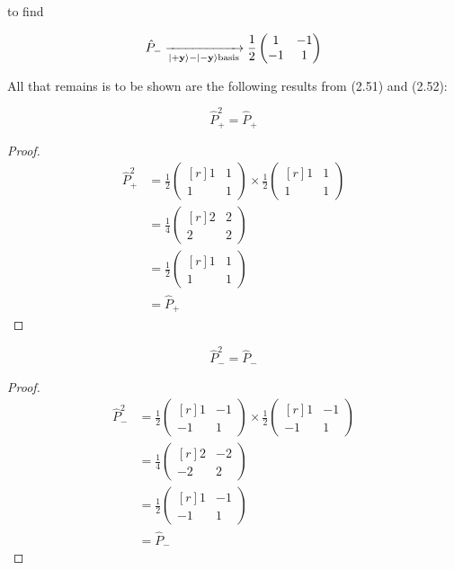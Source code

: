 \documentclass[11pt]{amsart}
\begin{document}
to find 

\[
\hat{P}_-\xrightarrow[\ket{+\textbf{y}}-\ket{-\textbf{y}}\text{basis}]{}
\frac{1}{2}
\begin{pmatrix*}
1&-1\\
-1&1
\end{pmatrix*}
\]

All that remains is to be shown are the following results from (2.51) and (2.52):

\[
\hat{P}_+^2=\hat{P}_+
\]

\begin{proof}

\begin{equation*}
\begin{split}
\hat{P}_+^2 & =
\frac{1}{2}
\begin{pmatrix*}[r]
1&1\\
1&1
\end{pmatrix*}
\times
\frac{1}{2}
\begin{pmatrix*}[r]
1&1\\
1&1
\end{pmatrix*}\\
&=
\frac{1}{4}
\begin{pmatrix*}[r]
2&2\\
2&2
\end{pmatrix*}\\
&=
\frac{1}{2}
\begin{pmatrix*}[r]
1&1\\
1&1
\end{pmatrix*}\\
&=
\hat{P}_+
\end{split}
\end{equation*}

\end{proof}

\[
\hat{P}_-^2=\hat{P}_-
\]

\begin{proof}

\begin{equation*}
\begin{split}
\hat{P}_-^2 & =
\frac{1}{2}
\begin{pmatrix*}[r]
1&-1\\
-1&1
\end{pmatrix*}
\times
\frac{1}{2}
\begin{pmatrix*}[r]
1&-1\\
-1&1
\end{pmatrix*}\\
&=
\frac{1}{4}
\begin{pmatrix*}[r]
2&-2\\
-2&2
\end{pmatrix*}\\
&=
\frac{1}{2}
\begin{pmatrix*}[r]
1&-1\\
-1&1
\end{pmatrix*}\\
&=
\hat{P}_-
\end{split}
\end{equation*}

\end{proof}
\end{document}
